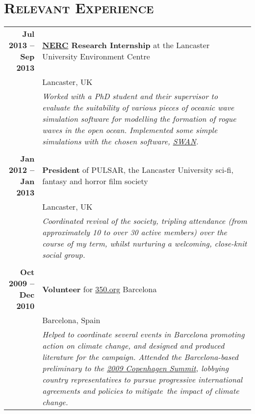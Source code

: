 \documentclass[a4paper,10pt]{article} %
\begin{document}
\section{\textsc{Relevant Experience}}
\centering
\begin{tabularx}{\textwidth}{r|X}
\textbf{Jul 2013 --  Sep 2013} & \textbf{\href{http://www.nerc.ac.uk/}{NERC} Research Internship} at the Lancaster University Environment Centre \\
                                             & Lancaster, UK \\
                                             & \footnotesize{\emph{Worked with a PhD student and their supervisor to evaluate the suitability of various pieces of oceanic wave simulation software for modelling the formation of rogue waves in the open ocean. Implemented some simple simulations with the chosen software, \href{http://swanmodel.sourceforge.net/}{SWAN}.}} \\
\multicolumn{2}{r}{} \\
\textbf{Jan 2012 -- Jan 2013} & \textbf{President} of PULSAR, the Lancaster University sci-fi, fantasy and horror film society \\
                             & Lancaster, UK \\
                             & \footnotesize{\emph{Coordinated revival of the society, tripling attendance (from approximately 10 to over 30
                               active members) over the course of my term, whilst nurturing a welcoming, close-knit social group.}} \\
\multicolumn{2}{r}{} \\
\textbf{Oct 2009 -- Dec 2010} & \textbf{Volunteer} for {\href{http://www.350.org}{350.org} Barcelona}\\
                                   & Barcelona, Spain\\
                                   & \footnotesize\emph{Helped to coordinate several events in Barcelona
                                     promoting action on climate change, and designed and produced literature for the campaign. Attended the
                                     Barcelona-based preliminary to the \href{https://en.wikipedia.org/wiki/Copenhagen_Summit}{2009 Copenhagen Summit}, lobbying country representatives to pursue progressive international agreements and policies to mitigate\ the impact of climate change.}
\end{tabularx}

\end{document}
